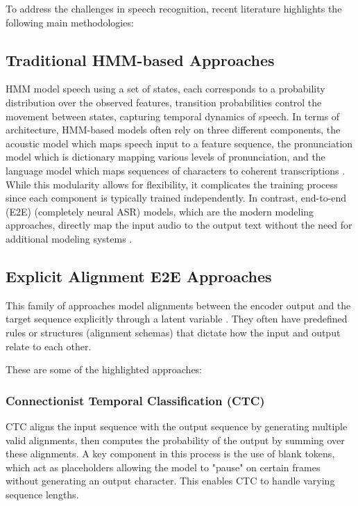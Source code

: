 \documentclass[10pt, english]{article}
\begin{document}
To address the challenges in speech recognition, recent literature \citep{sym11081018, PrabhavalkarEnd-to-End2024} highlights the following main methodologies:

\subsection{Traditional HMM-based Approaches}
HMM model speech using a set of states, each corresponds to a probability distribution over the observed features, transition probabilities control the movement between states, capturing temporal dynamics of speech.
In terms of architecture, HMM-based models often rely on three different components, the acoustic model which maps speech input to a feature sequence, the pronunciation model which is dictionary mapping various levels of pronunciation, and the language model which maps sequences of characters to coherent transcriptions \citep{sym11081018}. While this modularity allows for flexibility, it complicates the training process since each component is typically trained independently. In contrast, end-to-end (E2E) (completely neural ASR) models, which are the modern modeling approaches, directly map the input audio to the output text without the need for additional modeling systems \citep{sym11081018, PrabhavalkarEnd-to-End2024}.

\subsection{Explicit Alignment E2E Approaches}
This family of approaches model alignments between the encoder output and the target sequence explicitly through a latent variable \citep{PrabhavalkarEnd-to-End2024}. They often have predefined rules or structures (alignment schemas) that dictate how the input and output relate to each other.

These are some of the highlighted approaches:


\subsubsection{Connectionist Temporal Classification (CTC)}
CTC \citep{GravesCTC2006} aligns the input sequence with the output sequence by generating multiple valid alignments, then computes the probability of the output by summing over these alignments. A key component in this process is the use of blank tokens, which act as placeholders allowing the model to "pause" on certain frames without generating an output character. This enables CTC to handle varying sequence lengths.
\end{document}
